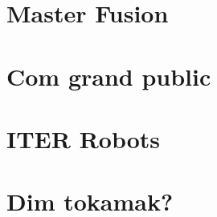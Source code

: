 \chaptertoc{}
\section{Master Fusion}
\section{Com grand public}
\section{ITER Robots}
\section{Dim tokamak?}